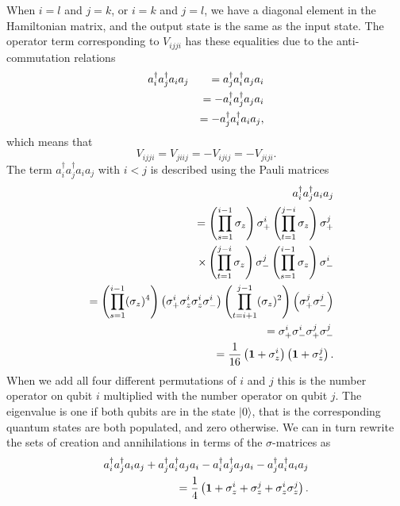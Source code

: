 When $i=l$ and $j=k$, or $i=k$ and $j=l$, we have a
diagonal element in the Hamiltonian matrix, and the output state
is the same as the input state. 
The operator term corresponding to $V_{ijji}$ has these equalities due
to the anti-commutation relations
\begin{eqnarray}
a^\dag_i a^\dag_j a_i a_j &&=  a^\dag_j a^\dag_i a_j a_i \notag\\
&&= -a^\dag_i a^\dag_j a_j a_i \notag\\
&&= -a^\dag_j a^\dag_i a_i a_j,
\end{eqnarray}
which means that
\begin{equation}
\label{eq:Vdiags}
V_{ijji} = V_{jiij} = - V_{ijij} = - V_{jiji}.
\end{equation}
The term $a^\dag_i a^\dag_j a_i a_j$
with $i<j$ is described using the Pauli matrices
\begin{eqnarray}
&&a^\dag_i a^\dag_j a_i a_j \\ &&= 
\left(\prod_{s=1}^{i-1} \sigma_z \right) \sigma_+^i 
\left(\prod_{t=1}^{j-i} \sigma_z \right)
\sigma_+^j \notag \\
&&\times\left(\prod_{t=1}^{j-i} \sigma_z \right) \sigma_-^j
\left(\prod_{s=1}^{i-1} \sigma_z \right) \sigma_-^i \notag \\
&&=\left(\prod_{s=1}^{i-1} (\sigma_z)^4 \right) \left( \sigma_+^i \sigma_z^i
\sigma_z^i \sigma_-^i\right) \left(\prod_{t=i+1}^{j-1} (\sigma_z)^2 \right) \left(
\sigma_+^j  
\sigma_-^j\right) \notag \\
&&=\sigma_+^i\sigma_-^i\sigma_+^j\sigma_-^j \notag\\
&&=\frac{1}{16} \left( {\bf 1} + \sigma_z^i\right) \left( {\bf 1} + \sigma_z^j
\right). 
\end{eqnarray}
When we add all four different permutations of
$i$ and $j$ this is the number operator on qubit $i$ multiplied with
the number operator on qubit $j$.
The eigenvalue is one if both qubits are in
the state $ |0\rangle $, that is the corresponding quantum states are both
populated, and zero otherwise.
We can in turn rewrite the sets of creation and annihilations in terms of the 
$\sigma$-matrices as
\begin{eqnarray}
a^\dag_i a^\dag_j a_i a_j + a^\dag_j a^\dag_i a_j a_i
-a^\dag_i a^\dag_j a_j a_i-a^\dag_j a^\dag_i a_i a_j \notag \\
= \frac{1}{4} \left( {\bf 1} 
+\sigma_z^i + \sigma_z^j +\sigma_z^i\sigma_z^j \right).
\end{eqnarray}


